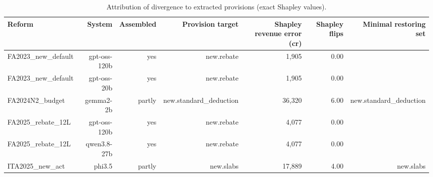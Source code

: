 \begin{table}[t]
\centering\small
\caption{Attribution of divergence to extracted provisions (exact Shapley values).}
\label{tab:attribution}
\begin{tabular}{lrrrrrr}
\toprule
Reform & System & Assembled & Provision target & Shapley revenue error (cr) & Shapley flips & Minimal restoring set \\
\midrule
FA2023\_new\_default & gpt-oss-120b & yes & new.rebate & 1,905 & 0.00 &  \\
FA2023\_new\_default & gpt-oss-20b & yes & new.rebate & 1,905 & 0.00 &  \\
FA2024N2\_budget & gemma2-2b & partly & new.standard\_deduction & 36,320 & 6.00 & new.standard\_deduction \\
FA2025\_rebate\_12L & gpt-oss-120b & yes & new.rebate & 4,077 & 0.00 &  \\
FA2025\_rebate\_12L & qwen3.8-27b & yes & new.rebate & 4,077 & 0.00 &  \\
ITA2025\_new\_act & phi3.5 & partly & new.slabs & 17,889 & 4.00 & new.slabs \\
\bottomrule
\end{tabular}
\end{table}
